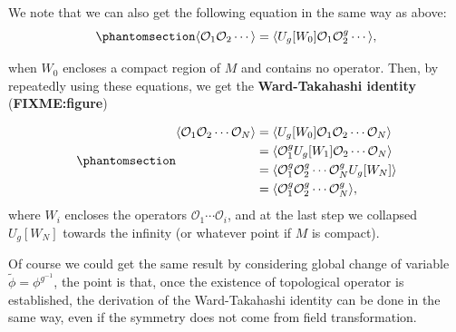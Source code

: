 \documentclass[
  letterpaper,
  DIV=11,
  numbers=noendperiod]{scrreport}
\begin{document}
We note that we can also get the following equation in the same way as
above: \begin{equation}\phantomsection\label{eq-bubble}{
\langle \mathcal{O}_1 \mathcal{O}_2 \cdots \rangle = \langle U_g[W_0] \mathcal{O}_1 \mathcal{O}_2^g \cdots \rangle,
}\end{equation}

when \(W_0\) encloses a compact region of \(M\) and contains no
operator. Then, by repeatedly using these equations, we get the
\textbf{Ward-Takahashi identity} (\textbf{FIXME:figure})

\begin{tcolorbox}[enhanced jigsaw, left=2mm, toprule=.15mm, bottomtitle=1mm, titlerule=0mm, leftrule=.75mm, colframe=quarto-callout-important-color-frame, opacitybacktitle=0.6, title=\textcolor{quarto-callout-important-color}{\faExclamation}\hspace{0.5em}{Ward-Takahashi Identity}, bottomrule=.15mm, breakable, arc=.35mm, toptitle=1mm, colbacktitle=quarto-callout-important-color!10!white, rightrule=.15mm, opacityback=0, coltitle=black, colback=white]

\begin{equation}\phantomsection\label{eq-Ward-Takahashi}{
\begin{aligned}
\langle \mathcal{O}_1 \mathcal{O}_2 \cdots \mathcal{O}_N \rangle
&= 
\langle U_g[W_0] \mathcal{O}_1 \mathcal{O}_2 \cdots \mathcal{O}_N \rangle\\
&= 
\langle \mathcal{O}_1^g U_g[W_1] \mathcal{O}_2 \cdots \mathcal{O}_N \rangle\\
&= 
\langle \mathcal{O}_1^g  \mathcal{O}_2^g \cdots \mathcal{O}_N^g U_g[W_N] \rangle\\
&= 
\langle \mathcal{O}_1^g  \mathcal{O}_2^g \cdots \mathcal{O}_N^g\rangle,
\end{aligned}
}\end{equation} where \(W_i\) encloses the operators
\(\mathcal{O}_1 \cdots \mathcal{O}_i\), and at the last step we
collapsed \(U_g[W_N]\) towards the infinity (or whatever point if \(M\)
is compact).

\end{tcolorbox}

Of course we could get the same result by considering global change of
variable \(\widetilde{\phi} = \phi^{g^{-1}}\), the point is that, once
the existence of topological operator is established, the derivation of
the Ward-Takahashi identity can be done in the same way, even if the
symmetry does not come from field transformation.
\end{document}
